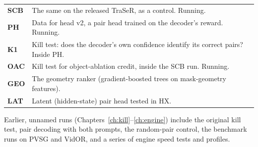 \documentclass[11pt,openany]{book}
\begin{document}
\begin{center}
\begin{tabular}{@{}>{\bfseries}l p{12.5cm}@{}}
SCB & The same on the released TraSeR, as a control. Running. \\
PH & Data for head v2, a pair head trained on the decoder's reward. Running. \\
K1 & Kill test: does the decoder's own confidence identify its correct pairs? Inside PH. \\
OAC & Kill test for object-ablation credit, inside the SCB run. Running. \\
GEO & The geometry ranker (gradient-boosted trees on mask-geometry features). \\
LAT & Latent (hidden-state) pair head tested in HX. \\
\bottomrule
\end{tabular}
\end{center}
Earlier, unnamed runs (Chapters~\ref{ch:kill}--\ref{ch:engine}) include the original kill test, pair decoding with both prompts,
the random-pair control, the benchmark runs on PVSG and VidOR, and a series of engine speed tests and profiles.
\end{document}
